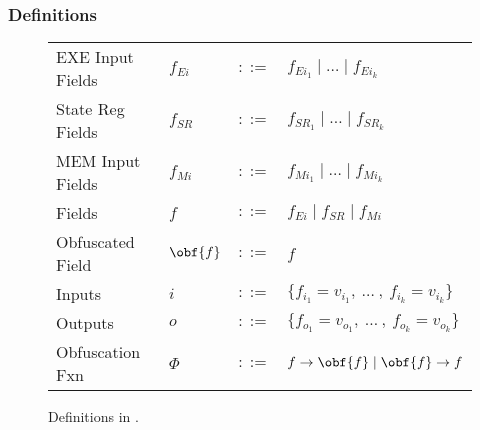 \documentclass[sigconf,usenames,dvipsnames,svgnames,table]{acmart}
\begin{document}
      \subsubsection{Definitions}\label{sec:spec:synt:defn}
        \begin{figure}
          \centering
          \begin{tabular}{l l c l}
            EXE Input Fields & $f_{Ei}$  & $::=$ & $f_{Ei_{1}} \mid \dots \mid f_{Ei_{k}}$\\
            State Reg Fields & $f_{SR}$  & $::=$ & $f_{SR_{1}} \mid \dots \mid f_{SR_{k}}$\\
            MEM Input Fields & $f_{Mi}$  & $::=$ & $f_{Mi_{1}} \mid \dots \mid f_{Mi_{k}}$\\
            Fields           & $f$       & $::=$ & $f_{Ei} \mid f_{SR} \mid f_{Mi} $ \\
            Obfuscated Field & $\obf{f}$ & $::=$ & $f$\\
            Inputs           & $i$       & $::=$ & $\{f_{i_{1}} = v_{i_{1}} ,\ \dots\ ,\ f_{i_{k}} = v_{i_{k}}\}$\\
            Outputs          & $o$       & $::=$ & $\{f_{o_{1}} = v_{o_{1}} ,\ \dots\ ,\ f_{o_{k}} = v_{o_{k}}\}$\\
            Obfuscation Fxn  & $\Phi$    & $::=$ & $f \rightarrow \obf{f} \mid \obf{f} \rightarrow f$
          \end{tabular}
          \caption{Definitions in \sysname.}
          \label{fig:spec:synt:defn}
        \end{figure}

\end{document}
